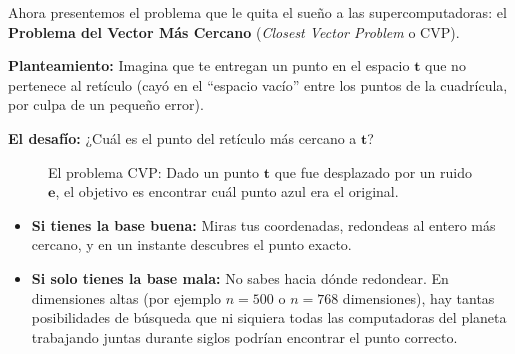 Ahora presentemos el problema que le quita el sueño a las supercomputadoras: el \textbf{Problema del Vector Más Cercano} (\textit{Closest Vector Problem} o CVP).

\begin{intuicion}
\textbf{Planteamiento:} Imagina que te entregan un punto en el espacio $\mathbf{t}$ que no pertenece al retículo (cayó en el ``espacio vacío'' entre los puntos de la cuadrícula, por culpa de un pequeño error). 

\textbf{El desafío:} ¿Cuál es el punto del retículo más cercano a $\mathbf{t}$?
\end{intuicion}

\begin{figure}[htbp]
\centering
{}
\caption{El problema CVP: Dado un punto $\mathbf{t}$ que fue desplazado por un ruido $\mathbf{e}$, el objetivo es encontrar cuál punto azul era el original.}
\label{fig:cvp}
\end{figure}

\begin{itemize}
  \item \textbf{Si tienes la base buena:} Miras tus coordenadas, redondeas al entero más cercano, y en un instante descubres el punto exacto.
  \item \textbf{Si solo tienes la base mala:} No sabes hacia dónde redondear. En dimensiones altas (por ejemplo $n = 500$ o $n = 768$ dimensiones), hay tantas posibilidades de búsqueda que ni siquiera todas las computadoras del planeta trabajando juntas durante siglos podrían encontrar el punto correcto.
\end{itemize}

